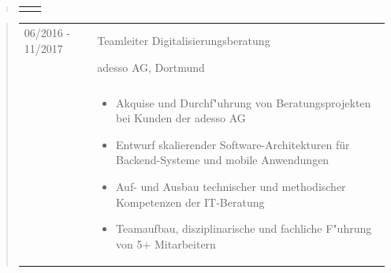 \begin{quote}
\begin{tabular}{p{4cm}l}
\begin{minipage}{10cm}
			\end{minipage}
		\end{tabular}
	\end{quote}
	\begin{quote}
		\begin{tabular}{p{4cm}l}
			06/2016 - 11/2017&Teamleiter Digitalisierungsberatung\\
			&adesso AG, Dortmund\\
			\\
			&\begin{minipage}{10cm}
                \begin{itemize}
                    \item Akquise und Durchf"uhrung von Beratungsprojekten bei Kunden der adesso AG
                    \item Entwurf skalierender Software-Architekturen für Backend-Systeme und mobile Anwendungen
                    \item Auf- und Ausbau technischer und methodischer Kompetenzen der IT-Beratung
                    \item Teamaufbau, disziplinarische und fachliche F"uhrung von 5+ Mitarbeitern
                \end{itemize}
				
			\end{minipage}
		\end{tabular}
	\end{quote}
